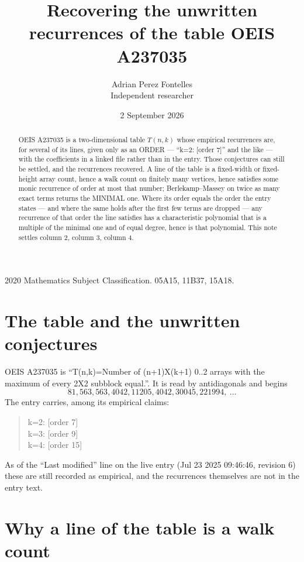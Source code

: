 \documentclass[11pt,a4paper]{article}
\title{Recovering the unwritten recurrences of the table OEIS A237035}
\author{Adrian Perez Fontelles\\ \small Independent researcher}
\date{2 September 2026}
\theoremstyle{plain}
\theoremstyle{definition}
\begin{document}
\maketitle

\begin{abstract}
OEIS A237035 is a two-dimensional table $T(n,k)$ whose empirical recurrences are, for several of
its lines, given only as an ORDER --- ``k=2: [order 7]'' and the like --- with the
coefficients in a linked file rather than in the entry. Those conjectures can still be settled,
and the recurrences recovered. A line of the table is a fixed-width or fixed-height array
count, hence a walk count on finitely many vertices, hence satisfies some monic recurrence of
order at most that number; Berlekamp--Massey on twice as many exact terms returns the MINIMAL
one. Where its order equals the order the entry states --- and where the same holds after the
first few terms are dropped --- any recurrence of that order the line satisfies has a
characteristic polynomial that is a multiple of the minimal one and of equal degree, hence is
that polynomial. This note settles column 2, column 3, column 4.
\end{abstract}

\noindent\small 2020 Mathematics Subject Classification. 05A15, 11B37, 15A18.\normalsize

\section{The table and the unwritten conjectures}

OEIS A237035 is ``T(n,k)=Number of (n+1)X(k+1) 0..2 arrays with the maximum of every 2X2 subblock equal.''. It is read by antidiagonals and begins
\[
81, 563, 563, 4042, 11205, 4042, 30045, 221994,\ \dots
\]
The entry carries, among its empirical claims:
\begin{quote}\small
k=2: [order 7]\\
k=3: [order 9]\\
k=4: [order 15]
\end{quote}
As of the ``Last modified'' line on the live entry (Jul 23 2025 09:46:46, revision 6) these are still
recorded as empirical, and the recurrences themselves are not in the entry text.

\section{Why a line of the table is a walk count}
\end{document}
